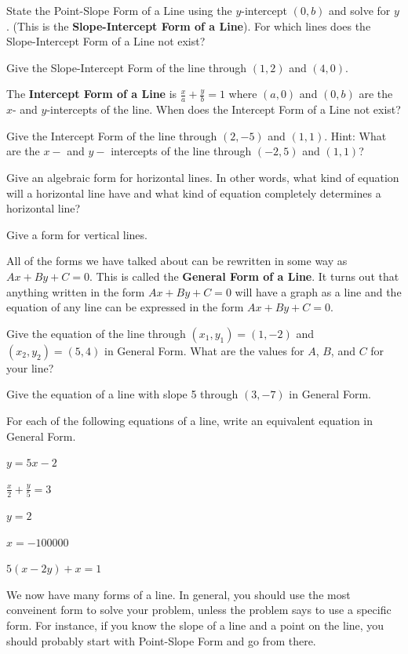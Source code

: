 \bq State the Point-Slope Form of a Line using the $y$-intercept $(0,b)$ and solve for $y$. (This is the \textbf{Slope-Intercept Form of a Line}). For which lines does the Slope-Intercept Form of a Line not exist?
\eq

\bq Give the Slope-Intercept Form of the line through $(1,2)$ and $(4,0)$.
\eq

\bq The \textbf{Intercept Form of a Line} is $\frac{x}{a}+\frac{y}{b} =1$ where $(a,0)$ and $(0,b)$ are the $x$- and $y$-intercepts of the line. When does the Intercept Form of a Line not exist?
\eq

\bq Give the Intercept Form of the line through $(2,-5)$ and $(1,1)$. Hint: What are the $x-$ and $y-$ intercepts of the line through $(-2,5)$ and $(1,1)$?
\eq

\bq Give an algebraic form for horizontal lines. In other words, what kind of equation will a horizontal line have and what kind of equation completely determines a horizontal line?
\eq

\bq\label{q15} Give a form for vertical lines.
\eq

\begin{info} All of the forms we have talked about can be rewritten in some way as $ Ax+By+C=0$. This is called the \textbf{General Form of a Line}. It turns out that anything written in the form $ Ax+By+C=0$ will have a graph as a line and the equation of any line can be expressed in the form $ Ax+By+C=0$.  \end{info}

\question Give the equation of the line through $(x_1,y_1)=(1,-2)$ and $(x_2,y_2) = (5,4)$ in General Form. What are the values for $A$, $B$, and $C$ for your line?

\question Give the equation of a line with slope 5 through $(3,-7)$ in General Form.

\bq For each of the following equations of a line, write an equivalent equation in General Form.
\be
\item $y=5x-2$
\item $ \frac{x}{2}+\frac{y}{5}=3$
\item $y=2$
\item $x=-100000$
\item $5(x-2y)+x=1$
\ee
\eq

We now have many forms of a line. In general, you should use the most conveinent form to solve your problem, unless the problem says to use a specific form. For instance, if you know the slope of a line and a point on the line, you should probably start with Point-Slope Form and go from there.
